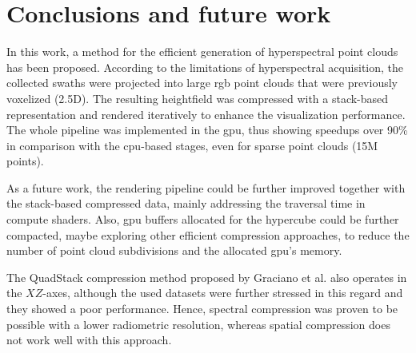 \section{Conclusions and future work}

In this work, a method for the efficient generation of hyperspectral point clouds has been proposed. According to the limitations of hyperspectral acquisition, the collected swaths were projected into large \acrshort{rgb} point clouds that were previously voxelized (2.5D). The resulting heightfield was compressed with a stack-based representation and rendered iteratively to enhance the visualization performance. The whole pipeline was implemented in the \acrshort{gpu}, thus showing speedups over 90\% in comparison with the \acrshort{cpu}-based stages, even for sparse point clouds (15M points).

As a future work, the rendering pipeline could be further improved together with the stack-based compressed data, mainly addressing the traversal time in compute shaders. Also, \acrshort{gpu} buffers allocated for the hypercube could be further compacted, maybe exploring other efficient compression approaches, to reduce the number of point cloud subdivisions and the allocated \acrshort{gpu}'s memory. 

\begin{kaobox}[frametitle=QuadStack compression of spatial data in hypercubes]
The QuadStack compression method proposed by Graciano et al. \cite{graciano_quadstack_2021} also operates in the $XZ$-axes, although the used datasets were further stressed in this regard and they showed a poor performance. Hence, spectral compression was proven to be possible with a lower radiometric resolution, whereas spatial compression does not work well with this approach.  
\end{kaobox}